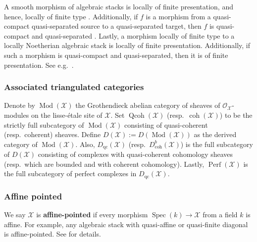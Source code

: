 \documentclass[11pt]{amsart}
\theoremstyle{plain}
\theoremstyle{definition}
\numberwithin{equation}{section}
\numberwithin{theorem}{section}
\begin{document}
A smooth morphism of algebraic stacks is locally of finite presentation, and hence, locally of finite type \cite[\href{https://stacks.math.columbia.edu/tag/0DNP}{Tag 0DNP} \& \href{https://stacks.math.columbia.edu/tag/06Q5}{Tag 06Q5}]{stacks-project}. 
Additionally, if $f$ is a morphism from a quasi-compact quasi-separated source to a quasi-separated target, then $f$ is quasi-compact and quasi-separated \cite[\href{https://stacks.math.columbia.edu/tag/075S}{Tag 075S}]{stacks-project}. Lastly, a morphism locally of finite type to a locally Noetherian algebraic stack is locally of finite presentation. 
Additionally, if such a morphism is quasi-compact and quasi-separated, then it is of finite presentation. 
See e.g.\ \cite[\href{https://stacks.math.columbia.edu/tag/0DQJ}{Tag 0DQJ}]{stacks-project}.

\subsubsection{Associated triangulated categories}
\label{sec:prelim_stacks_categories}

Denote by $\operatorname{Mod}(\mathcal{X})$ the Grothendieck abelian category of sheaves of $\mathcal{O}_\mathcal{X}$-modules on the lisse-\'{e}tale site of $\mathcal{X}$. 
Set $\operatorname{Qcoh}(\mathcal{X})$ (resp.\ $\operatorname{coh}(\mathcal{X})$) to be the strictly full subcategory of $\operatorname{Mod}(\mathcal{X})$ consisting of quasi-coherent (resp.\ coherent) sheaves. 
Define $D(\mathcal{X}):=D(\operatorname{Mod}(\mathcal{X}))$ as the derived category of $\operatorname{Mod}(\mathcal{X})$. 
Also, $D_{\operatorname{qc}}(\mathcal{X})$ (resp.\ $D^b_{\operatorname{coh}}(\mathcal{X})$) is the full subcategory of $D(\mathcal{X})$ consisting of complexes with quasi-coherent cohomology sheaves (resp.\ which are bounded and with coherent cohomology). 
Lastly, $\operatorname{Perf}(\mathcal{X})$ is the full subcategory of perfect complexes in $D_{\operatorname{qc}}(\mathcal{X})$.

\subsubsection{Affine pointed}
\label{sec:prelim_stacks_affine_pointed}

We say $\mathcal{X}$ is \textbf{affine-pointed} if every morphism $\operatorname{Spec}(k) \to \mathcal{X}$ from a field $k$ is affine. 
For example, any algebraic stack with quasi-affine or quasi-finite diagonal is affine-pointed. See \cite{Hall/Rydh:2019} for details.
\end{document}
